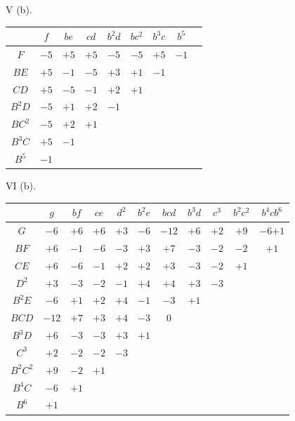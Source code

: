 \documentclass[11pt]{article}
\begin{document}
\bigskip

\begin{center}
\renewcommand{\arraystretch}{1.15}
V (b).\\[0.3em]
\begin{tabular}{c|cccccccc}
 & $f$ & $be$ & $cd$ & $b^2 d$ & $bc^2$ & $b^3 c$ & $b^5$ \\ \hline
$F$ & $-5$ & $+5$ & $+5$ & $-5$ & $-5$ & $+5$ & $-1$ \\
$BE$ & $+5$ & $-1$ & $-5$ & $+3$ & $+1$ & $-1$ & \\
$CD$ & $+5$ & $-5$ & $-1$ & $+2$ & $+1$ & & \\
$B^2 D$ & $-5$ & $+1$ & $+2$ & $-1$ & & & \\
$BC^2$ & $-5$ & $+2$ & $+1$ & & & & \\
$B^3 C$ & $+5$ & $-1$ & & & & & \\
$B^5$ & $-1$ & & & & & & \\
\end{tabular}
\end{center}

\begin{center}
\renewcommand{\arraystretch}{1.15}
VI (b).\\[0.3em]
\begin{tabular}{c|cccccccccc}
 & $g$ & $bf$ & $ce$ & $d^2$ & $b^2 e$ & $bcd$ & $b^3 d$ & $c^3$ & $b^2 c^2$ & $b^4 c$\;$b^6$ \\ \hline
$G$ & $-6$ & $+6$ & $+6$ & $+3$ & $-6$ & $-12$ & $+6$ & $+2$ & $+9$ & $-6$\;$+1$ \\
$BF$ & $+6$ & $-1$ & $-6$ & $-3$ & $+3$ & $+7$ & $-3$ & $-2$ & $-2$ & $+1$\; \\
$CE$ & $+6$ & $-6$ & $-1$ & $+2$ & $+2$ & $+3$ & $-3$ & $-2$ & $+1$ & \; \\
$D^2$ & $+3$ & $-3$ & $-2$ & $-1$ & $+4$ & $+4$ & $+3$ & $-3$ & & \; \\
$B^2 E$ & $-6$ & $+1$ & $+2$ & $+4$ & $-1$ & $-3$ & $+1$ & & & \; \\
$BCD$ & $-12$ & $+7$ & $+3$ & $+4$ & $-3$ & $0$ & & & & \; \\
$B^3 D$ & $+6$ & $-3$ & $-3$ & $+3$ & $+1$ & & & & & \; \\
$C^3$ & $+2$ & $-2$ & $-2$ & $-3$ & & & & & & \; \\
$B^2 C^2$ & $+9$ & $-2$ & $+1$ & & & & & & & \; \\
$B^4 C$ & $-6$ & $+1$ & & & & & & & & \; \\
$B^6$ & $+1$ & & & & & & & & & \; \\
\end{tabular}
\end{center}
\end{document}
